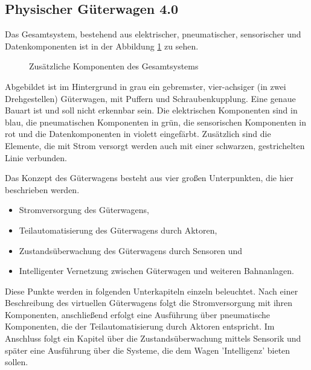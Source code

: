 \subsection{Physischer Güterwagen 4.0}
Das Gesamtsystem, bestehend aus elektrischer, pneumatischer, sensorischer und Datenkomponenten ist in der Abbildung \ref{fig:GesSys} zu sehen.\par
    \begin{figure}[hbt]
        \centering
    
        \caption{Zusätzliche Komponenten des Gesamtsystems}
        \label{fig:GesSys}
    \end{figure}
Abgebildet ist im Hintergrund in grau ein gebremster, vier-achsiger (in zwei Drehgestellen) Güterwagen, mit Puffern und Schraubenkupplung. Eine genaue Bauart ist und soll nicht erkennbar sein. Die elektrischen Komponenten sind in blau, die pneumatischen Komponenten in grün, die sensorischen Komponenten in rot und die Datenkomponenten in violett eingefärbt. Zusätzlich sind die Elemente, die mit Strom versorgt werden auch mit einer schwarzen, gestrichelten Linie verbunden.\par
Das Konzept des Güterwagens besteht aus vier großen Unterpunkten, die hier beschrieben werden.
\begin{itemize}
    \item Stromversorgung des Güterwagens,
    \item Teilautomatisierung des Güterwagens durch Aktoren,
    \item Zustandsüberwachung des Güterwagens durch Sensoren und
    \item Intelligenter Vernetzung zwischen Güterwagen und weiteren Bahnanlagen.
\end{itemize}
Diese Punkte werden in folgenden Unterkapiteln einzeln beleuchtet. Nach einer Beschreibung des virtuellen Güterwagens folgt die Stromversorgung mit ihren Komponenten, anschließend erfolgt eine Ausführung über pneumatische Komponenten, die der Teilautomatisierung durch Aktoren entspricht. Im Anschluss folgt ein Kapitel über die Zustandsüberwachung mittels Sensorik und später eine Ausführung über die Systeme, die dem Wagen 'Intelligenz' bieten sollen.

